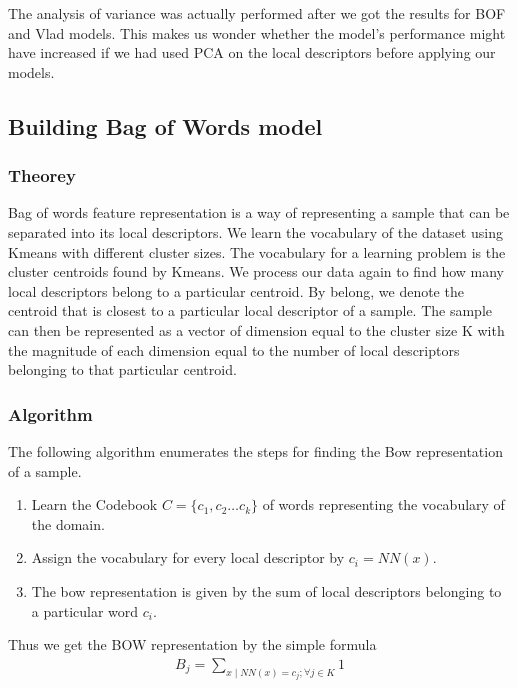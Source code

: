 \documentclass[final,leqno,onefignum,onetabnum]{siamltexmm}
\begin{document}
The analysis of variance was actually performed after we got the results for BOF and Vlad models.  This makes us wonder whether the model's performance might have increased if we had used PCA on the local descriptors before applying our models.

\subsection{Building Bag of Words model}
\subsubsection{Theorey}
Bag of words feature representation is a way of representing a sample that can be separated into its local descriptors.  
We learn the vocabulary of the dataset using Kmeans with different cluster sizes.
The vocabulary for a learning problem is the cluster centroids found by Kmeans.
We process our data again to find how many local descriptors belong to a particular centroid.
By belong, we denote the centroid that is closest to a particular local descriptor of a sample.
The sample can then be represented as a vector of dimension equal to the cluster size K with the magnitude of each dimension equal to the number of local descriptors belonging to that particular centroid.

\subsubsection{Algorithm}
The following algorithm enumerates the steps for finding the Bow representation of a sample.
\begin{enumerate}
  \item Learn the Codebook $ C = \{c_{1}, c_{2} \ldots c_{k}\} $ of words representing the vocabulary of the domain.
  \item Assign the vocabulary for every local descriptor by $ c_{i} = NN(x) $.
  \item The bow representation is given by the sum of local descriptors belonging to a particular word $ c_{i} $.
\end{enumerate}

Thus we get the BOW representation by the simple formula
\begin{align*}
  B_{j} = \sum_{x \mid NN(x) = c_{j};  \forall j \in K} 1
\end{align*}
\end{document}

